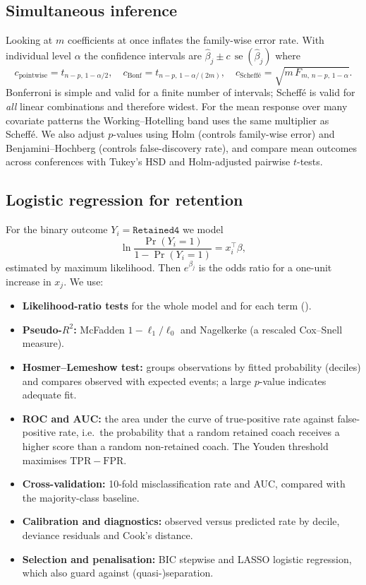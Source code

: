 \documentclass[9pt,a4paper]{article}
\newcommand{\var}[1]{\texttt{\detokenize{#1}}}
\begin{document}
\subsection{Simultaneous inference}
Looking at $m$ coefficients at once inflates the family-wise error rate. With individual level $\alpha$ the confidence intervals are $\hat\beta_j\pm c\,\operatorname{se}(\hat\beta_j)$ where
\[
c_{\text{pointwise}}=t_{n-p,\,1-\alpha/2},\quad
c_{\text{Bonf}}=t_{n-p,\,1-\alpha/(2m)},\quad
c_{\text{Scheff\'e}}=\sqrt{m\,F_{m,\,n-p,\,1-\alpha}}.
\]
Bonferroni is simple and valid for a finite number of intervals; Scheff\'e is valid for \emph{all} linear combinations and therefore widest. For the mean response over many covariate patterns the Working--Hotelling band uses the same multiplier as Scheff\'e. We also adjust $p$-values using Holm (controls family-wise error) and Benjamini--Hochberg (controls false-discovery rate), and compare mean outcomes across conferences with Tukey's HSD and Holm-adjusted pairwise $t$-tests.

\subsection{Logistic regression for retention}
For the binary outcome $Y_i=\texttt{Retained4}$ we model
\[
\ln\frac{\Pr(Y_i=1)}{1-\Pr(Y_i=1)}=x_i^\top\beta,
\]
estimated by maximum likelihood. Then $e^{\beta_j}$ is the odds ratio for a one-unit increase in $x_j$. We use:
\begin{itemize}
  \item \textbf{Likelihood-ratio tests} for the whole model and for each term (\var{drop1}).
  \item \textbf{Pseudo-$R^2$:} McFadden $1-\ell_1/\ell_0$ and Nagelkerke (a rescaled Cox--Snell measure).
  \item \textbf{Hosmer--Lemeshow test:} groups observations by fitted probability (deciles) and compares observed with expected events; a large $p$-value indicates adequate fit.
  \item \textbf{ROC and AUC:} the area under the curve of true-positive rate against false-positive rate, i.e.\ the probability that a random retained coach receives a higher score than a random non-retained coach. The Youden threshold maximises $\mathrm{TPR}-\mathrm{FPR}$.
  \item \textbf{Cross-validation:} 10-fold misclassification rate and AUC, compared with the majority-class baseline.
  \item \textbf{Calibration and diagnostics:} observed versus predicted rate by decile, deviance residuals and Cook's distance.
  \item \textbf{Selection and penalisation:} BIC stepwise and LASSO logistic regression, which also guard against (quasi-)separation.
\end{itemize}
\end{document}
